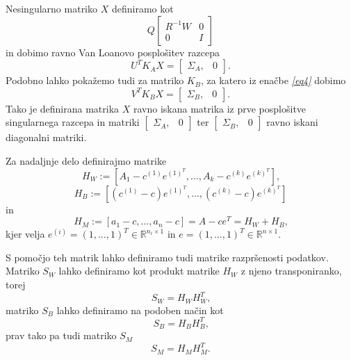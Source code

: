 \documentclass[mat1]{article}
\theoremstyle{definition}
\begin{document}

Nesingularno matriko $X$ definiramo kot
\begin{equation} \label{def-X}
Q
\begin{bmatrix}
R^{-1} W & 0 \\
0 & I 
\end{bmatrix}
\end{equation}
in dobimo ravno Van Loanovo posplošitev razcepa
\begin{equation} \label{Van-Loan-Ka}
U^T K_A X = \left[\begin{array}{cc} \Sigma_A, & 0 \end{array}\right] \text{.}
\end{equation}
Podobno lahko pokažemo tudi za matriko $K_B$, za katero iz enačbe \textit{\eqref{eq4}} dobimo
\begin{equation} \label{Van-Loan-Kb}
V^T K_B X = \left[\begin{array}{cc} \Sigma_B, & 0 \end{array}\right] \text{.}
\end{equation}
Tako je definirana matrika $X$ ravno iskana matrika iz prve posplošitve singularnega razcepa in matriki $\left[\begin{array}{cc} \Sigma_A, & 0 \end{array}\right]$ ter $\left[\begin{array}{cc} \Sigma_B, & 0 \end{array}\right]$ ravno iskani diagonalni matriki.

Za nadaljnje delo definirajmo matrike\begin{equation} \label{H_W1}
H_W :=\left[A_1 - c^{(1)}e^{(1)^T}, \ldots, A_k - c^{(k)}e^{(k)^T}\right] \text{,}
\end{equation}
\begin{equation} \label{H_B1}
H_B := \left[(c^{(1)} - c)e^{(1)^T}, \ldots,(c^{(k)} - c) e^{(k)^T}\right]
\end{equation}
in
$$H_M := \left[a_1 - c, \ldots, a_n - c\right] = A - ce^T = H_W + H_B\text{,}$$
kjer velja
$e^{(i)} = (1,\ldots, 1) ^T \in \mathbb{R}^{ n_i \times 1 }$ in $e =  (1,\ldots, 1) ^T \in \mathbb{R}^{ n \times 1 }$.

S pomočjo teh matrik lahko definiramo tudi matrike razpršenosti podatkov. Matriko $S_W$ lahko definiramo kot produkt matrike $H_W$ z njeno transponiranko, torej
\begin{equation} \label{S_W-def}
S_W = H_W H_W^T 
\text{,}
\end{equation}
matriko $S_B$ lahko definiramo na podoben način kot
\begin{equation} \label{S_B-def}
S_B = H_B H_B^T 
\text{,}
\end{equation}
prav tako pa tudi matriko $S_M$
\begin{equation} \label{S_M-def}
S_M = H_M H_M^T 
\text{.}
\end{equation}
\end{document}
